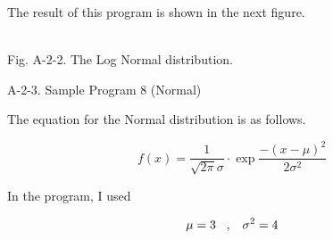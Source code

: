 \vspace*{10mm}

\noindent
The result of this program is shown in the next figure.

\clearpage

\begin{center}
\\
\vspace*{10mm}
Fig. A-2-2. The Log Normal distribution.\\
\end{center}

\vspace*{20mm}

\noindent
{\Large A-2-3. Sample Program 8 (Normal)}

\vspace*{7mm}

\noindent
The equation for the Normal distribution is as follows.

\begin{equation}
f(x) = \frac{1}{\sqrt{2\pi}\sigma} \cdot \exp{\frac{-(x-\mu)^2}{2\sigma^2}}
\end{equation}

\noindent
In the program, I used

\begin{equation}
\mu = 3 \hspace{3mm} , \hspace{3mm} \sigma^2 = 4
\end{equation}

